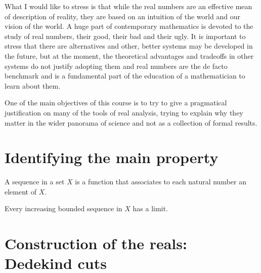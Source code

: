 What I would like to stress is that while the real numbers are an effective mean of description 
of reality, they are based on an intuition of the world and our vision of the world.
A huge part of contemporary mathematics is devoted to the study of real numbers, their good, 
their bad and their ugly.
It is important to stress that there are alternatives and other, better systems may be developed in the future,
but at the moment, the theoretical advantages and tradeoffs in other systems do not justify 
adopting them and real numbers are the de facto benchmark and is a fundamental part of 
the education of a mathematician to learn about them.

One of the main objectives of this course is to try to give a pragmatical justification on many
of the tools of real analysis, trying to explain why they matter in the wider panorama of science
and not as a collection of formal results.

\section{Identifying the main property}

\begin{definition}
A sequence in a set $X$ is a function that associates to each natural number 
an element of $X$.
\end{definition}


\begin{property}
Every increasing bounded sequence in $X$ has a limit.
\end{property}

\section{Construction of the reals: Dedekind cuts}